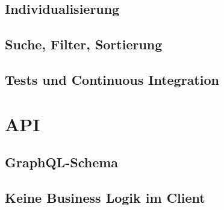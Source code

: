 \subsection{Individualisierung}

\subsection{Suche, Filter, Sortierung}

\subsection{Tests und Continuous Integration}

\section{API}

\subsection{GraphQL-Schema} %
\subsection{Keine Business Logik im Client}
